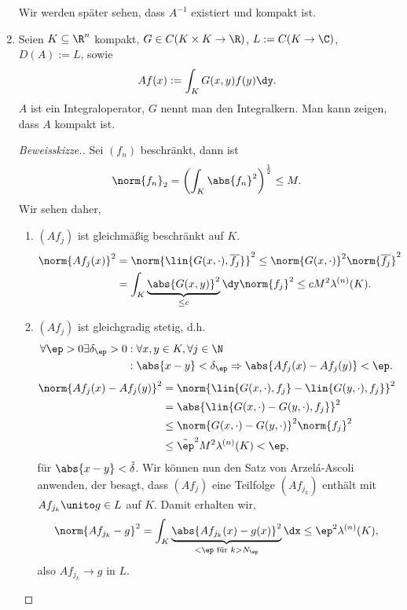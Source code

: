 \begin{bsp}
\begin{enumerate}[label=\arabic{*}.)]
Wir werden später sehen, dass $A^{-1}$ existiert und kompakt ist.
\item Seien $K\subseteq\R^n$ kompakt, $G\in C(K\times K\to\R)$,
$L:=C(K\to\C)$, $D(A):=L$, sowie
\begin{align*}
Af(x) := \int_K G(x,y)f(y)\dy.
\end{align*}
$A$ ist ein Integraloperator, $G$ nennt man den Integralkern. Man kann zeigen,
dass $A$ kompakt ist.
\begin{proof}[Beweisskizze.]
Sei $(f_n)$ beschränkt, dann ist
\begin{align*}
\norm{f_n}_2 = \left(\int_K \abs{f_n}^2 \right)^{\frac{1}{2}} \le M.
\end{align*}
Wir sehen daher,
\begin{enumerate}[label=(\roman{*})]
  \item $(Af_j)$ ist gleichmäßig beschränkt auf $K$.
\begin{align*}
\norm{Af_j(x)}^2 &= \norm{\lin{G(x,\cdot),\overline{f_j}}}^2
\le \norm{G(x,\cdot)}^2\norm{\overline{f_j}}^2\\
&= \int_K \underbrace{\abs{G(x,y)}^2}_{\le c}\dy \norm{f_j}^2
\le cM^2\lambda^{(n)}(K).
\end{align*}
\item $(Af_j)$ ist gleichgradig stetig, d.h.
\begin{align*}
\forall\ep > 0 \exists \delta_\ep > 0 &: \forall x,y\in K, \forall j\in\N\\
&: \abs{x-y} <\delta_\ep \Rightarrow \abs{Af_j(x)-Af_j(y)}<\ep.
\end{align*}
\begin{align*}
\norm{Af_j(x)-Af_j(y)}^2 &= \norm{\lin{G(x,\cdot),f_j} -
\lin{G(y,\cdot),f_j}}^2\\ &= \abs{\lin{G(x,\cdot)-G(y,\cdot),f_j}}^2\\
&\le \norm{G(x,\cdot)-G(y,\cdot)}^2\norm{f_j}^2\\
&\le \tilde{\ep}^2M^2\lambda^{(n)}(K) < \ep, 
\end{align*}
für $\abs{x-y}<\tilde{\delta}$. Wir können nun den Satz von Arzelá-Ascoli
anwenden, der besagt, dass $(Af_j)$ eine Teilfolge $(Af_{j_k})$ enthält mit
$Af_{j_k}\unito g\in L$ auf $K$. Damit erhalten wir,
\begin{align*}
\norm{Af_{j_k}-g}^2 = \int_K
\underbrace{\abs{Af_{j_k}(x)-g(x)}^2}_{<\ep\text{ für } k>N_\ep}\dx \le
\ep^2\lambda^{(n)}(K),
\end{align*}
also $Af_{j_k}\to g$ in $L$.\bsphere
\end{enumerate}
\end{proof}
\end{enumerate}
\end{bsp}

